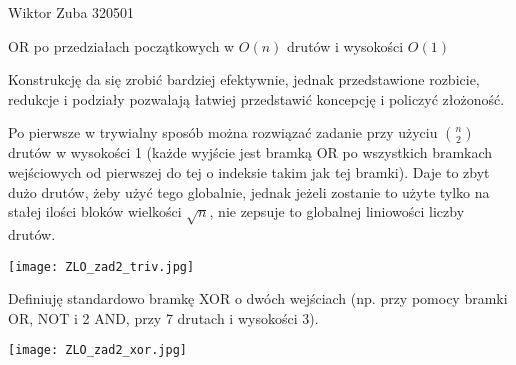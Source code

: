 \documentclass{article}
\begin{document}
Wiktor Zuba 320501\newline

OR po przedziałach początkowych w $O(n)$ drutów i wysokości $O(1)$\newline

Konstrukcję da się zrobić bardziej efektywnie, jednak przedstawione rozbicie, redukcje i podziały pozwalają łatwiej przedstawić koncepcję
i policzyć złożoność.\newline

Po pierwsze w trywialny sposób można rozwiązać zadanie przy użyciu ${n\choose2}$ drutów w wysokości 1
(każde wyjście jest bramką OR po wszystkich bramkach wejściowych od pierwszej do tej o indeksie takim jak tej bramki). Daje to zbyt dużo drutów,
żeby użyć tego globalnie, jednak jeżeli zostanie to użyte tylko na stałej ilości bloków wielkości $\sqrt{n}$,
nie zepsuje to globalnej liniowości liczby drutów.\newline
\begin{center}\texttt{[image: ZLO\_zad2\_triv.jpg]}\end{center}

Definiuję standardowo bramkę XOR o dwóch wejściach (np. przy pomocy bramki OR, NOT i 2 AND, przy 7 drutach i wysokości 3).\newline
\begin{center}\texttt{[image: ZLO\_zad2\_xor.jpg]}\end{center}\newpage
\end{document}
